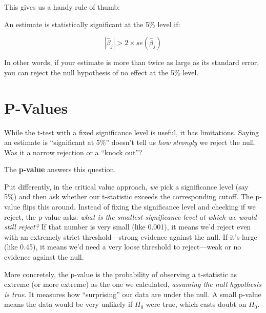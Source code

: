 \documentclass[
  letterpaper,
  DIV=11,
  numbers=noendperiod]{scrreprt}
\begin{document}
This gives us a handy rule of thumb:

\begin{tcolorbox}[enhanced jigsaw, arc=.35mm, bottomrule=.15mm, bottomtitle=1mm, breakable, colback=white, colbacktitle=quarto-callout-tip-color!10!white, colframe=quarto-callout-tip-color-frame, coltitle=black, left=2mm, leftrule=.75mm, opacityback=0, opacitybacktitle=0.6, rightrule=.15mm, title=\textcolor{quarto-callout-tip-color}{\faLightbulb}\hspace{0.5em}{The ``Rule of 2''}, titlerule=0mm, toprule=.15mm, toptitle=1mm]

An estimate is statistically significant at the 5\% level if:

\[|\hat{\beta}_j| > 2 \times se(\hat{\beta}_j)\]

In other words, if your estimate is more than twice as large as its
standard error, you can reject the null hypothesis of no effect at the
5\% level.

\end{tcolorbox}

\section{P-Values}\label{p-values}

While the t-test with a fixed significance level is useful, it has
limitations. Saying an estimate is ``significant at 5\%'' doesn't tell
us \emph{how strongly} we reject the null. Was it a narrow rejection or
a ``knock out''?

The \textbf{p-value} answers this question.

Put differently, in the critical value approach, \emph{we} pick a
significance level (say 5\%) and then ask whether our t-statistic
exceeds the corresponding cutoff. The p-value flips this around. Instead
of fixing the significance level and checking if we reject, the p-value
asks: \emph{what is the smallest significance level at which we would
still reject?} If that number is very small (like 0.001), it means we'd
reject even with an extremely strict threshold---strong evidence against
the null. If it's large (like 0.45), it means we'd need a very loose
threshold to reject---weak or no evidence against the null.

More concretely, the p-value is the probability of observing a
t-statistic as extreme (or more extreme) as the one we calculated,
\emph{assuming the null hypothesis is true}. It measures how
``surprising'' our data are under the null. A small p-value means the
data would be very unlikely if \(H_0\) were true, which casts doubt on
\(H_0\).
\end{document}
